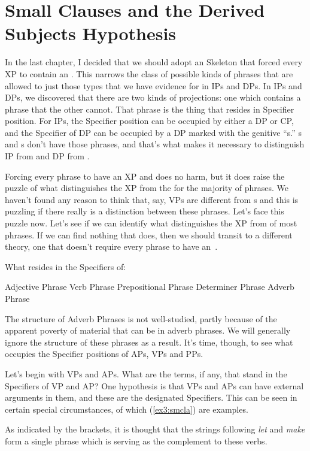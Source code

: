 \section{Small Clauses and the Derived Subjects Hypothesis}
\label{sec:smallclauses}

In the last chapter, I decided that we should adopt an  Skeleton that forced every XP to contain an . This narrows the class of possible kinds of phrases that are allowed to just those types that we have evidence for in IPs and DPs. In IPs and DPs, we discovered that there are two kinds of projections: one which contains a phrase that the other cannot. That phrase is the thing that resides in Specifier position. For IPs, the Specifier position can be occupied by either a DP or CP, and the Specifier of DP can be occupied by a DP marked with the genitive ``s.'' s and s don't have those phrases, and that's what makes it necessary to distinguish IP from  and DP from . 

Forcing every phrase to have an XP and  does no harm, but it does raise the puzzle of what distinguishes the XP from the  for the majority of phrases. We haven't found any reason to think that, say, VPs are different from s and this is puzzling if there really is a distinction between these phrases. Let's face this puzzle now. Let's see if we can identify what distinguishes the XP from  of most phrases. If we can find nothing that does, then we should transit to a different  theory, one that doesn't require every phrase to have an~.
\begin{exe}
\ex \label{ex3:specquest} What resides in the Specifiers of:
\begin{xlist}
	\ex Adjective Phrase
	\ex Verb Phrase
	\ex Prepositional Phrase
	\ex Determiner Phrase
	\ex Adverb Phrase
\end{xlist}
\end{exe}
The structure of Adverb Phrases is not well-studied, partly because of the apparent poverty of material that can be in adverb phrases. We will generally ignore the structure of these phrases as a result. It's time, though, to see what occupies the Specifier positions of APs, VPs and PPs.

Let's begin with VPs and APs. What are the terms, if any, that stand in the Specifiers of VP and AP? One hypothesis is that VPs and APs can have external arguments in them, and these are the designated Specifiers. This can be seen in certain special circumstances, of which (\ref{ex3:smcla}) are examples.
\begin{exe}
	\ex \label{ex3:smcla} 
	\begin{xlist}
	\end{xlist}
\end{exe}
As indicated by the brackets, it is thought that the strings following \emph{let} and \emph{make} form a single phrase which is serving as the complement to these verbs.

